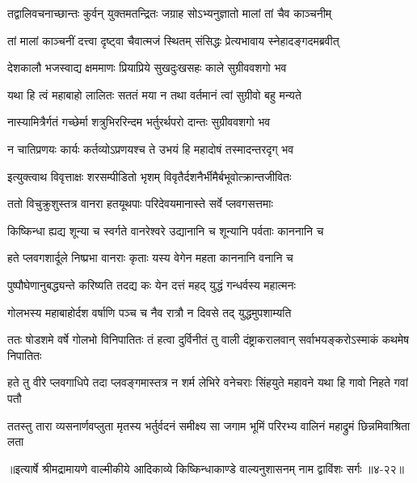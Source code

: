 \twolineshloka
{तद्वालिवचनाच्छान्तः कुर्वन् युक्तमतन्द्रितः}
{जग्राह सोऽभ्यनुज्ञातो मालां तां चैव काञ्चनीम्} %

\twolineshloka
{तां मालां काञ्चनीं दत्त्वा दृष्ट्वा चैवात्मजं स्थितम्}
{संसिद्धः प्रेत्यभावाय स्नेहादङ्गदमब्रवीत्} %

\twolineshloka
{देशकालौ भजस्वाद्य क्षममाणः प्रियाप्रिये}
{सुखदुःखसहः काले सुग्रीववशगो भव} %

\twolineshloka
{यथा हि त्वं महाबाहो लालितः सततं मया}
{न तथा वर्तमानं त्वां सुग्रीवो बहु मन्यते} %

\twolineshloka
{नास्यामित्रैर्गतं गच्छेर्मा शत्रुभिररिन्दम}
{भर्तुरर्थपरो दान्तः सुग्रीववशगो भव} %

\twolineshloka
{न चातिप्रणयः कार्यः कर्तव्योऽप्रणयश्च ते}
{उभयं हि महादोषं तस्मादन्तरदृग् भव} %

\twolineshloka
{इत्युक्त्वाथ विवृत्ताक्षः शरसम्पीडितो भृशम्}
{विवृतैर्दशनैर्भीमैर्बभूवोत्क्रान्तजीवितः} %

\twolineshloka
{ततो विचुक्रुशुस्तत्र वानरा हतयूथपाः}
{परिदेवयमानास्ते सर्वे प्लवगसत्तमाः} %

\twolineshloka
{किष्किन्धा ह्यद्य शून्या च स्वर्गते वानरेश्वरे}
{उद्यानानि च शून्यानि पर्वताः काननानि च} %

\twolineshloka
{हते प्लवगशार्दूले निष्प्रभा वानराः कृताः}
{यस्य वेगेन महता काननानि वनानि च} %

\twolineshloka
{पुष्पौघेणानुबद्ध्यन्ते करिष्यति तदद्य कः}
{येन दत्तं महद् युद्धं गन्धर्वस्य महात्मनः} %

\twolineshloka
{गोलभस्य महाबाहोर्दश वर्षाणि पञ्च च}
{नैव रात्रौ न दिवसे तद् युद्धमुपशाम्यति} %

\threelineshloka
{ततः षोडशमे वर्षे गोलभो विनिपातितः}
{तं हत्वा दुर्विनीतं तु वाली दंष्ट्राकरालवान्}
{सर्वाभयङ्करोऽस्माकं कथमेष निपातितः} %

\twolineshloka
{हते तु वीरे प्लवगाधिपे तदा प्लवङ्गमास्तत्र न शर्म लेभिरे}
{वनेचराः सिंहयुते महावने यथा हि गावो निहते गवां पतौ} %

\twolineshloka
{ततस्तु तारा व्यसनार्णवप्लुता मृतस्य भर्तुर्वदनं समीक्ष्य सा}
{जगाम भूमिं परिरभ्य वालिनं महाद्रुमं छिन्नमिवाश्रिता लता} %


॥इत्यार्षे श्रीमद्रामायणे वाल्मीकीये आदिकाव्ये किष्किन्धाकाण्डे वाल्यनुशासनम् नाम द्वाविंशः सर्गः ॥४-२२॥

